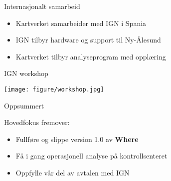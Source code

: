 \documentclass[14pt,c]{beamer}
\begin{document}
\begin{frame}{Internasjonalt samarbeid}
\begin{itemize}
  \item Kartverket samarbeider med IGN i Spania
  \item IGN tilbyr hardware og support til Ny-Ålesund
  \item Kartverket tilbyr analyseprogram med opplæring 
\end{itemize}
\end{frame}

\begin{frame}{IGN workshop}
\begin{centering}
    \hfill\texttt{[image: figure/workshop.jpg]}\hspace*{\fill}
\end{centering}
\end{frame}


\begin{frame}{Oppsummert}
  \begin{centering}
    Hovedfokus fremover:
  \end{centering}

  \begin{itemize}
    \item Fullføre og slippe version 1.0 av \textbf{Where}
    \item Få i gang operasjonell analyse på kontrollsenteret
    \item Oppfylle vår del av avtalen med IGN
  \end{itemize}
\end{frame}
\end{document}
